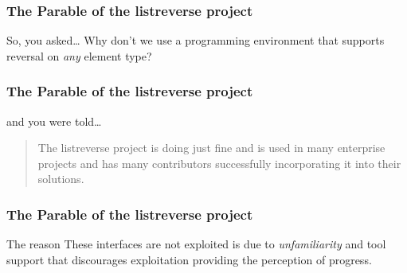 \begin{frame}
\frametitle{The Parable of the listreverse project}
\begin{block}{So, you asked\ldots}
Why don't we use a programming environment that supports reversal on \emph{any} element type?
\end{block}
\end{frame}

\begin{frame}
\frametitle{The Parable of the listreverse project}
\begin{block}{and you were told\ldots}
\begin{quote}
The listreverse project is doing just fine and is used in many enterprise projects and has many contributors successfully incorporating it into their solutions.
\end{quote}
\end{block}
\end{frame}

\begin{frame}
\frametitle{The Parable of the listreverse project}
\begin{block}{The reason}
These interfaces are not exploited is due to \emph{unfamiliarity} and tool support that discourages exploitation providing the perception of progress.
\end{block}
\end{frame}







